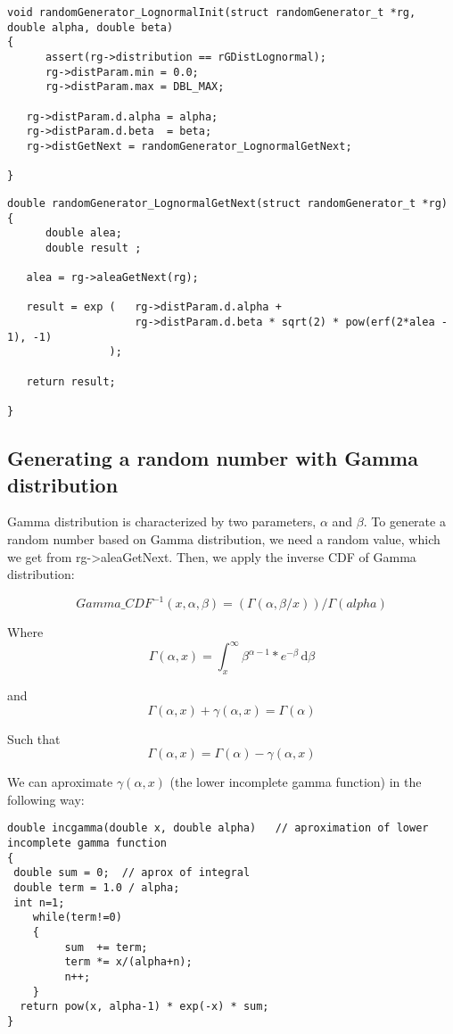 \begin{verbatim}
void randomGenerator_LognormalInit(struct randomGenerator_t *rg, double alpha, double beta)
{
      assert(rg->distribution == rGDistLognormal);   
      rg->distParam.min = 0.0;
      rg->distParam.max = DBL_MAX;
  
   rg->distParam.d.alpha = alpha;
   rg->distParam.d.beta  = beta; 
   rg->distGetNext = randomGenerator_LognormalGetNext;

}
\end{verbatim}

\begin{verbatim}
double randomGenerator_LognormalGetNext(struct randomGenerator_t *rg)
{  
      double alea;
      double result ;
   
   alea = rg->aleaGetNext(rg);

   result = exp (   rg->distParam.d.alpha + 
                    rg->distParam.d.beta * sqrt(2) * pow(erf(2*alea - 1), -1) 
                );

   return result;

}  
\end{verbatim}

\subsection{Generating a random number with Gamma distribution}


Gamma distribution is characterized by two parameters, $\alpha$ and $\beta$.
To generate a random number based on Gamma distribution, we need a random value, which we get from rg->aleaGetNext. Then, we apply the inverse CDF of Gamma distribution:
  
  $$ Gamma\_CDF^{-1}(x, \alpha, \beta) = (\Gamma(\alpha, \beta/x))/\Gamma(alpha) $$

   Where $$\Gamma(\alpha, x) = \int_x^\infty \! \beta^{\alpha-1}*e^{-\beta}\, \mathrm{d}\beta $$

   and $$\Gamma(\alpha, x) + \gamma(\alpha, x) = \Gamma(\alpha) $$

   Such that $$ \Gamma(\alpha, x) = \Gamma(\alpha) - \gamma(\alpha, x) $$

 We can aproximate $\gamma(\alpha, x)$ (the lower incomplete gamma function) in the following way:
\begin{verbatim}
double incgamma(double x, double alpha)   // aproximation of lower incomplete gamma function
{
 double sum = 0;  // aprox of integral
 double term = 1.0 / alpha;
 int n=1; 
    while(term!=0)
    {
         sum  += term;
         term *= x/(alpha+n);
         n++;
    }
  return pow(x, alpha-1) * exp(-x) * sum;
}
\end{verbatim}

